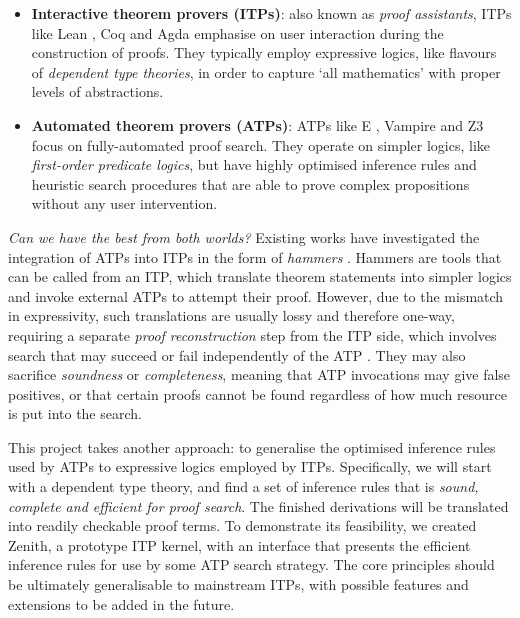 \documentclass[twoside]{report}
\begin{document}
\begin{itemize}
    \item \textbf{Interactive theorem provers (ITPs)}: also known as \emph{proof assistants}, ITPs like Lean \cite{moura2021lean}, Coq \cite{coq2024proof} and Agda \cite{norell2007towards} emphasise on user interaction during the construction of proofs. They typically employ expressive logics, like flavours of \emph{dependent type theories}, in order to capture `all mathematics' with proper levels of abstractions.

    \item \textbf{Automated theorem provers (ATPs)}: ATPs like E \cite{schulz2019faster}, Vampire \cite{kovacs2013first} and Z3 \cite{de2008proofs} focus on fully-automated proof search. They operate on simpler logics, like \emph{first-order predicate logics}, but have highly optimised inference rules and heuristic search procedures that are able to prove complex propositions without any user intervention.
\end{itemize}

\emph{Can we have the best from both worlds?} Existing works have investigated the integration of ATPs into ITPs in the form of \emph{hammers} \cite{bohme2010sledgehammer}. Hammers are tools that can be called from an ITP, which translate theorem statements into simpler logics and invoke external ATPs to attempt their proof. However, due to the mismatch in expressivity, such translations are usually lossy and therefore one-way, requiring a separate \emph{proof reconstruction} step from the ITP side, which involves search that may succeed or fail independently of the ATP \cite{paulsson2012three}. They may also sacrifice \emph{soundness} or \emph{completeness}, meaning that ATP invocations may give false positives, or that certain proofs cannot be found regardless of how much resource is put into the search.

This project takes another approach: to generalise the optimised inference rules used by ATPs to expressive logics employed by ITPs. Specifically, we will start with a dependent type theory, and find a set of inference rules that is \emph{sound, complete and efficient for proof search}. The finished derivations will be translated into readily checkable proof terms. To demonstrate its feasibility, we created Zenith, a prototype ITP kernel, with an interface that presents the efficient inference rules for use by some ATP search strategy. The core principles should be ultimately generalisable to mainstream ITPs, with possible features and extensions to be added in the future.
\end{document}

